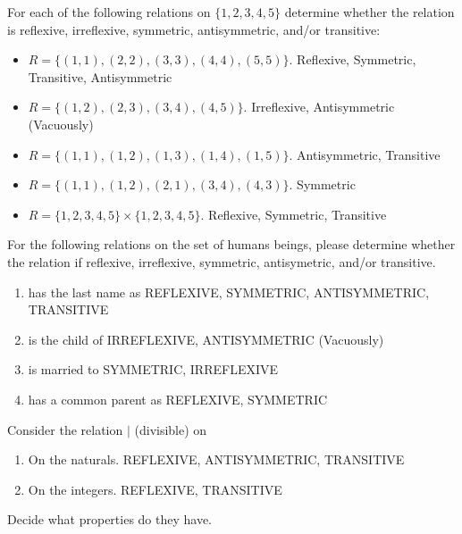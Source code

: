 \documentclass[11pt]{preprint}
\def\enumb{\begin{enumerate}}
\def\enume{\end{enumerate}}
\def\itemb{\begin{itemize}}
\def\iteme{\end{itemize}}
\begin{document}
\item For each of the following relations on $\{1,2,3,4,5\}$ determine whether the relation is reflexive, irreflexive, symmetric, antisymmetric, and/or transitive:
\itemb
\item $R=\{(1,1),(2,2),(3,3),(4,4),(5,5)\}$. Reflexive, Symmetric, Transitive, Antisymmetric
\item $R=\{(1,2),(2,3),(3,4),(4,5)\}$. Irreflexive, Antisymmetric (Vacuously)
\item $R=\{(1,1),(1,2),(1,3),(1,4),(1,5)\}$. Antisymmetric, Transitive
\item $R=\{(1,1),(1,2),(2,1),(3,4),(4,3)\}$. Symmetric
\item $R=\{1,2,3,4,5\}\times\{1,2,3,4,5\}$. Reflexive, Symmetric, Transitive
\iteme

\item For the following relations on the set of humans beings, please determine whether the relation if reflexive, irreflexive, symmetric, antisymetric, and/or transitive.
\enumb
\item has the last name as REFLEXIVE, SYMMETRIC, ANTISYMMETRIC, TRANSITIVE
\item is the child of IRREFLEXIVE, ANTISYMMETRIC (Vacuously)
\item is married to SYMMETRIC, IRREFLEXIVE
\item has a common parent as REFLEXIVE, SYMMETRIC
\enume

\item Consider the relation $|$ (divisible) on
\enumb
\item On the naturals. REFLEXIVE, ANTISYMMETRIC, TRANSITIVE
\item On the integers. REFLEXIVE, TRANSITIVE
\enume
Decide what properties do they have.
\end{document}
